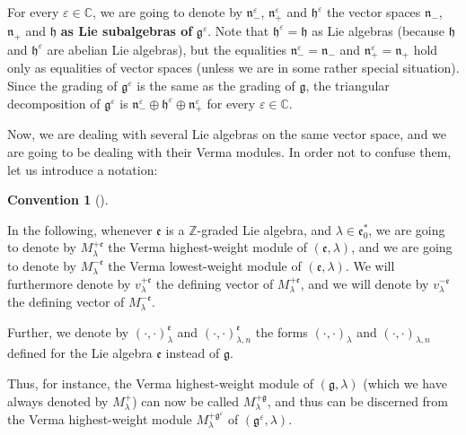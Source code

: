 \documentclass
[numbers=enddot,12pt,final,onecolumn,german,notitlepage]{scrartcl}%
\theoremstyle{definition}
\newtheorem{conv}[theo]{Convention}
\newenvironment{Convention}[1][]
{\begin{conv}[#1]\begin{leftbar}}
{\end{leftbar}\end{conv}}
\begin{document}
For every $\varepsilon\in\mathbb{C}$, we are going to denote by $\mathfrak{n}%
_{-}^{\varepsilon}$, $\mathfrak{n}_{+}^{\varepsilon}$ and $\mathfrak{h}%
^{\varepsilon}$ the vector spaces $\mathfrak{n}_{-}$, $\mathfrak{n}_{+}$ and
$\mathfrak{h}$ \textbf{as Lie subalgebras of }$\mathfrak{g}^{\varepsilon}$.
Note that $\mathfrak{h}^{\varepsilon}=\mathfrak{h}$ as Lie algebras (because
$\mathfrak{h}$ and $\mathfrak{h}^{\varepsilon}$ are abelian Lie algebras), but
the equalities $\mathfrak{n}_{-}^{\varepsilon}=\mathfrak{n}_{-}$ and
$\mathfrak{n}_{+}^{\varepsilon}=\mathfrak{n}_{+}$ hold only as equalities of
vector spaces (unless we are in some rather special situation). Since the
grading of $\mathfrak{g}^{\varepsilon}$ is the same as the grading of
$\mathfrak{g}$, the triangular decomposition of $\mathfrak{g}^{\varepsilon}$
is $\mathfrak{n}_{-}^{\varepsilon}\oplus\mathfrak{h}^{\varepsilon}%
\oplus\mathfrak{n}_{+}^{\varepsilon}$ for every $\varepsilon\in\mathbb{C}$.

Now, we are dealing with several Lie algebras on the same vector space, and we
are going to be dealing with their Verma modules. In order not to confuse
them, let us introduce a notation:

\begin{Convention}
In the following, whenever $\mathfrak{e}$ is a $\mathbb{Z}$-graded Lie
algebra, and $\lambda\in\mathfrak{e}_{0}^{\ast}$, we are going to denote by
$M_{\lambda}^{+\mathfrak{e}}$ the Verma highest-weight module of $\left(
\mathfrak{e},\lambda\right)  $, and we are going to denote by $M_{\lambda
}^{-\mathfrak{e}}$ the Verma lowest-weight module of $\left(  \mathfrak{e}%
,\lambda\right)  $. We will furthermore denote by $v_{\lambda}^{+\mathfrak{e}%
}$ the defining vector of $M_{\lambda}^{+\mathfrak{e}}$, and we will denote by
$v_{\lambda}^{-\mathfrak{e}}$ the defining vector of $M_{\lambda
}^{-\mathfrak{e}}$.

Further, we denote by $\left(  \cdot,\cdot\right)  _{\lambda}^{\mathfrak{e}}$
and $\left(  \cdot,\cdot\right)  _{\lambda,n}^{\mathfrak{e}}$ the forms
$\left(  \cdot,\cdot\right)  _{\lambda}$ and $\left(  \cdot,\cdot\right)
_{\lambda,n}$ defined for the Lie algebra $\mathfrak{e}$ instead of
$\mathfrak{g}$.
\end{Convention}

Thus, for instance, the Verma highest-weight module of $\left(  \mathfrak{g}%
,\lambda\right)  $ (which we have always denoted by $M_{\lambda}^{+}$) can now
be called $M_{\lambda}^{+\mathfrak{g}}$, and thus can be discerned from the
Verma highest-weight module $M_{\lambda}^{+\mathfrak{g}^{\varepsilon}}$ of
$\left(  \mathfrak{g}^{\varepsilon},\lambda\right)  $.
\end{document}
